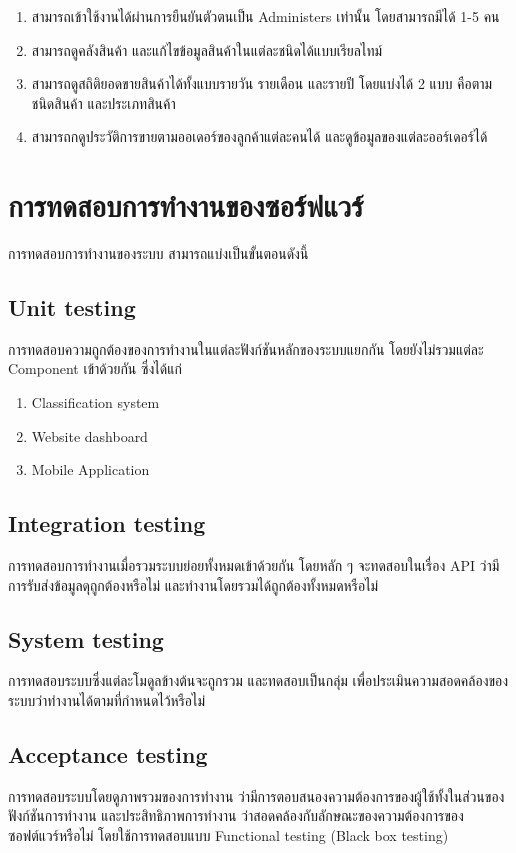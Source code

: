   \begin{enumerate}
    \item สามารถเข้าใช้งานได้ผ่านการยืนยันตัวตนเป็น Administers เท่านั้น โดยสามารถมีได้ 1-5 คน
    \item สามารถดูคลังสินค้า และแก้ไขข้อมูลสินค้าในแต่ละชนิดได้แบบเรียลไทม์
    \item สามารถดูสถิติยอดขายสินค้าได้ทั้งแบบรายวัน รายเดือน และรายปี โดยแบ่งได้ 2 แบบ คือตามชนิดสินค้า และประเภทสินค้า
    \item สามารถกดูประวัติการขายตามออเดอร์ของลูกค้าแต่ละคนได้ และดูข้อมูลของแต่ละออร์เดอร์ได้
\end{enumerate}



 

\section{การทดสอบการทำงานของซอร์ฟแวร์}
การทดสอบการทำงานของระบบ สามารถแบ่งเป็นขั้นตอนดังนี้
\subsection{Unit testing}
การทดสอบความถูกต้องของการทำงานในแต่ละฟังก์ชันหลักของระบบแยกกัน โดยยังไม่รวมแต่ละ Component เข้าด้วยกัน ซึ่งได้แก่
\begin{enumerate}
  \item Classification system
  \item Website dashboard
  \item Mobile Application
\end{enumerate}

\subsection{Integration testing}
การทดสอบการทำงานเมื่อรวมระบบย่อยทั้งหมดเข้าด้วยกัน โดยหลัก ๆ
 จะทดสอบในเรื่อง API ว่ามีการรับส่งข้อมูลดุถูกต้องหรือไม่ และทำงานโดยรวมได้ถูกต้องทั้งหมดหรือไม่
\subsection{System testing}
การทดสอบระบบซึ่งแต่ละโมดูลข้างต้นจะถูกรวม และทดสอบเป็นกลุ่ม 
เพื่อประเมินความสอดคล้องของระบบว่าทำงานได้ตามที่กำหนดไว้หรือไม่
\subsection{Acceptance testing}
การทดสอบระบบโดยดูภาพรวมของการทำงาน ว่ามีการตอบสนองความต้องการของผู้ใช้ทั้งในส่วนของฟังก์ชันการทำงาน 
และประสิทธิภาพการทำงาน ว่าสอดคล้องกับลักษณะของความต้องการของซอฟต์แวร์หรือไม่ 
โดยใช้การทดสอบแบบ Functional testing (Black box testing)
